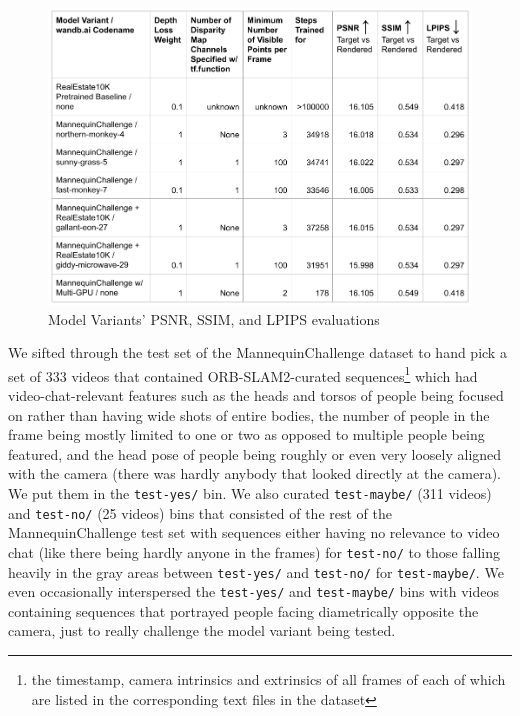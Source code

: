 \begin{figure}[!h]
    \includegraphics[width=1\columnwidth]{figures/model-variants-metrics.png}
    \caption{Model Variants' PSNR, SSIM, and LPIPS evaluations}
    \label{fig:model-variants-metrics}
    {\small }  
\end{figure}

We sifted through the test set of the MannequinChallenge dataset to hand pick a set of 333 videos that contained ORB-SLAM2-curated sequences\footnote{the timestamp, camera intrinsics and extrinsics of all frames of each of which are listed in the corresponding text files in the dataset} which had video-chat-relevant features such as the heads and torsos of people being focused on rather than having wide shots of entire bodies, the number of people in the frame being mostly limited to one or two as opposed to multiple people being featured, and the head pose of people being roughly or even very loosely aligned with the camera (there was hardly anybody that looked directly at the camera). We put them in the \texttt{test-yes/} bin. We also curated \texttt{test-maybe/} (311 videos) and \texttt{test-no/} (25 videos) bins that consisted of the rest of the MannequinChallenge test set with sequences either having no relevance to video chat (like there being hardly anyone in the frames) for \texttt{test-no/} to those falling heavily in the gray areas between \texttt{test-yes/} and \texttt{test-no/} for \texttt{test-maybe/}. We even occasionally interspersed the \texttt{test-yes/} and \texttt{test-maybe/} bins with videos containing sequences that portrayed people facing diametrically opposite the camera, just to really challenge the model variant being tested.

